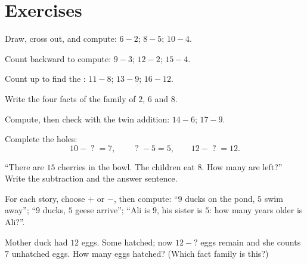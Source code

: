 \section{Exercises}

\begin{exercise}[$\star$]\label{exo:g1:subtraction:1}
Draw, cross out, and compute: $6 - 2$; \quad $8 - 5$; \quad
$10 - 4$.
\end{exercise}

\begin{exercise}[$\star$]\label{exo:g1:subtraction:2}
Count backward to compute: $9 - 3$; \quad $12 - 2$; \quad
$15 - 4$.
\end{exercise}

\begin{exercise}[$\star$]\label{exo:g1:subtraction:3}
Count up to find the : $11 - 8$; \quad $13 - 9$; \quad
$16 - 12$.
\end{exercise}

\begin{exercise}[$\star$]\label{exo:g1:subtraction:4}
Write the four facts of the family of $2$, $6$ and $8$.
\end{exercise}

\begin{exercise}[$\star$]\label{exo:g1:subtraction:5}
Compute, then check with the twin addition: $14 - 6$; \quad
$17 - 9$.
\end{exercise}

\begin{exercise}[$\star$]\label{exo:g1:subtraction:6}
Complete the holes:
\[
10 - \;?\; = 7, \qquad
\;?\; - 5 = 5, \qquad
12 - \;?\; = 12 .
\]
\end{exercise}

\begin{exercise}[$\star$]\label{exo:g1:subtraction:7}
``There are $15$ cherries in the bowl. The children eat $8$. How
many are left?'' Write the subtraction and the answer sentence.
\end{exercise}

\begin{exercise}[$\star$]\label{exo:g1:subtraction:8}
For each story, choose $+$ or $-$, then compute: ``$9$ ducks on the
pond, $5$ swim away''; ``$9$ ducks, $5$ geese arrive'';
``Ali is $9$, his sister is $5$: how many years older is Ali?''.
\end{exercise}

\begin{exercise}[$\star\star$]\label{exo:g1:subtraction:9}
Mother duck had $12$ eggs. Some hatched; now $12 - ?$ eggs remain
and she counts $7$ unhatched eggs. How many eggs hatched? (Which
fact family is this?)
\end{exercise}
